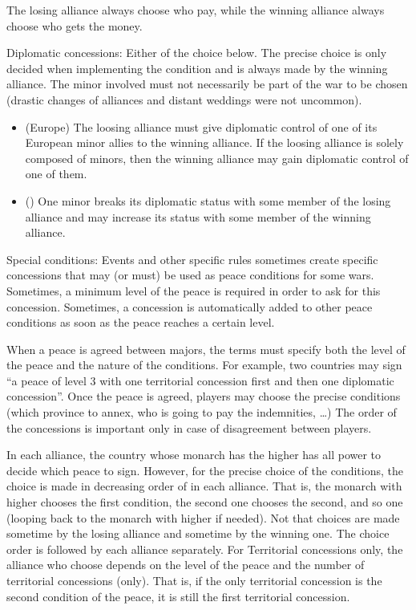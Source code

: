 \begin{modlist}
  The losing alliance always choose who pay, while the winning alliance always
  choose who gets the money.
\item[Diplomatic concessions:] Either of the choice below. The precise choice
  is only decided when implementing the condition and is always made by the
  winning alliance. The minor involved must not necessarily be part of the war
  to be chosen (drastic changes of alliances and distant weddings were not
  uncommon).
  \begin{itemize}
  \item (Europe) The loosing alliance must give diplomatic control of one of
    its European minor allies to the winning alliance. If the loosing alliance
    is solely composed of minors, then the winning alliance may gain
    diplomatic control of one of them.
  \item (\ROTW) One \ROTW minor breaks its diplomatic status with some member
    of the losing alliance and may increase its status with some member of the
    winning alliance.
  \end{itemize}
\item[Special conditions:] Events and other specific rules sometimes create
  specific concessions that may (or must) be used as peace conditions for some
  wars. Sometimes, a minimum level of the peace is required in order to ask
  for this concession. Sometimes, a concession is automatically added to other
  peace conditions as soon as the peace reaches a certain level.
\end{modlist}

When a peace is agreed between majors, the terms must specify both the level
of the peace and the nature of the conditions. For example, two countries may
sign ``a peace of level 3 with one territorial concession first and then one
diplomatic concession''.
\bparag Once the peace is agreed, players may choose the precise conditions
(which province to annex, who is going to pay the indemnities, \ldots)
\bparag The order of the concessions is important only in case of disagreement
between players.

\label{chPeace:Implementing conditions}
In each alliance, the country whose monarch has the higher \DIP has all power
to decide which peace to sign.
\bparag However, for the precise choice of the conditions, the choice is made
in decreasing order of \DIP in each alliance. That is, the monarch with higher
\DIP chooses the first condition, the second one chooses the second, and so
one (looping back to the monarch with higher \DIP if needed).
\bparag Not that choices are made sometime by the losing alliance and sometime
by the winning one. The choice order is followed by each alliance separately.
\bparag For Territorial concessions only, the alliance who choose depends on
the level of the peace and the number of territorial concessions (only). That
is, if the only territorial concession is the second condition of the peace,
it is still the first territorial concession.

